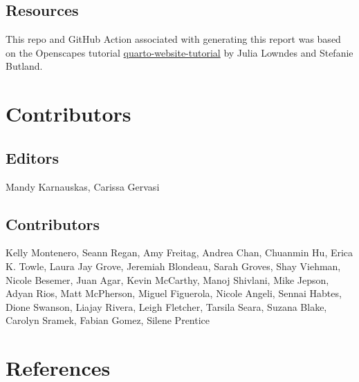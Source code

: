 \documentclass[
  letterpaper,
  oneside,
  open=any]{scrbook}
\begin{document}
\section{Resources}\label{resources}

This repo and GitHub Action associated with generating this report was
based on the Openscapes tutorial
\href{https://github.com/Openscapes/quarto-website-tutorial}{quarto-website-tutorial}
by Julia Lowndes and Stefanie Butland.


\chapter{Contributors}\label{contributors}

\section{\texorpdfstring{\textbf{Editors}}{Editors}}\label{editors}

Mandy Karnauskas, Carissa Gervasi

\section{\texorpdfstring{\textbf{Contributors}}{Contributors}}\label{contributors-1}

Kelly Montenero, Seann Regan, Amy Freitag, Andrea Chan, Chuanmin Hu,
Erica K. Towle, Laura Jay Grove, Jeremiah Blondeau, Sarah Groves, Shay
Viehman, Nicole Besemer, Juan Agar, Kevin McCarthy, Manoj Shivlani, Mike
Jepson, Adyan Rios, Matt McPherson, Miguel Figuerola, Nicole Angeli,
Sennai Habtes, Dione Swanson, Liajay Rivera, Leigh Fletcher, Tarsila
Seara, Suzana Blake, Carolyn Sramek, Fabian Gomez, Silene Prentice


\chapter*{References}\label{references}

\end{document}

